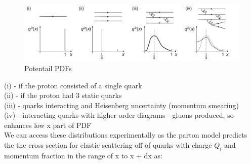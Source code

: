             \begin{figure}[H]
                \centering
                \includegraphics[width=12cm]{Chapters/Ch1-Intro/Ch1-Sec1-Background/pics/inelastic-ep/pdf-possibilities.PNG}
                \caption{Potentail PDFs}
            \end{figure}
            
            (i) - if the proton consisted of a single quark\\
            (ii) - if the proton had 3 static quarks\\
            (iii) - quarks interacting and Heisenberg uncertainty (momentum smearing)\\
            (iv) - interacting quarks with higher order diagrams - gluons produced, so enhances low x part of PDF\\
            \newline
            We can access these distributions experimentally as the parton model predicts the the cross section for elastic scattering off of quarks with charge $Q_i$ and momentum fraction in the range of x to x + dx as:
            \fi